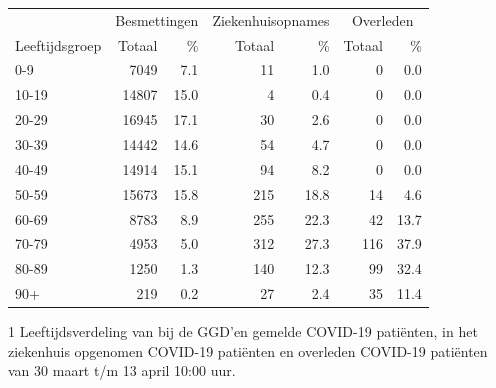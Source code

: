 \documentclass[
  english,
  man,floatsintext]{apa6}
\begin{document}
\begin{table}
\centering\begingroup\fontsize{11}{13}\selectfont

\begin{threeparttable}
\begin{tabular}{lrrrrrr}
\toprule
\multicolumn{1}{c}{ } & \multicolumn{2}{c}{Besmettingen} & \multicolumn{2}{c}{Ziekenhuisopnames} & \multicolumn{2}{c}{Overleden} \\
\cmidrule(l{3pt}r{3pt}){2-3} \cmidrule(l{3pt}r{3pt}){4-5} \cmidrule(l{3pt}r{3pt}){6-7}
Leeftijdsgroep & Totaal & \% & Totaal & \% & Totaal & \%\\
\midrule
0-9 & 7049 & 7.1 & 11 & 1.0 & 0 & 0.0\\
10-19 & 14807 & 15.0 & 4 & 0.4 & 0 & 0.0\\
20-29 & 16945 & 17.1 & 30 & 2.6 & 0 & 0.0\\
30-39 & 14442 & 14.6 & 54 & 4.7 & 0 & 0.0\\
40-49 & 14914 & 15.1 & 94 & 8.2 & 0 & 0.0\\
50-59 & 15673 & 15.8 & 215 & 18.8 & 14 & 4.6\\
60-69 & 8783 & 8.9 & 255 & 22.3 & 42 & 13.7\\
70-79 & 4953 & 5.0 & 312 & 27.3 & 116 & 37.9\\
80-89 & 1250 & 1.3 & 140 & 12.3 & 99 & 32.4\\
90+ & 219 & 0.2 & 27 & 2.4 & 35 & 11.4\\
\bottomrule
\end{tabular}
\begin{tablenotes}
\item[1] Leeftijdsverdeling van bij de GGD’en gemelde COVID-19 patiënten, in het ziekenhuis opgenomen COVID-19 patiënten en overleden COVID-19 patiënten van 30 maart t/m 13 april 10:00 uur.
\end{tablenotes}
\end{threeparttable}
\endgroup{}
\end{table}

\newpage
\end{document}
